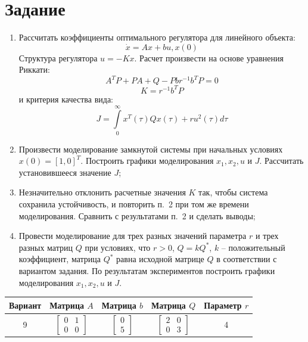 \documentclass[14pt, a4paper]{extarticle}
\begin{document}
	\onehalfspacing
	
	\setcounter{page}{2}
	
	\section*{Задание}
	
	\begin{enumerate}
		\item Рассчитать коэффициенты оптимального регулятора для линейного объекта:
		$$\dot{x}=Ax+bu, x(0)$$
		Структура регулятора $u=-Kx$. Расчет произвести на основе уравнения Риккати:
		$$A^TP+PA+Q-Pbr^{-1}b^TP=0$$
		$$K=r^{-1}b^TP$$
		и критерия качества вида:
		$$J=\int\limits_{0}^{\infty}x^T(\tau)Qx(\tau)+ru^2(\tau)d\tau$$
		\item Произвести моделирование замкнутой системы при начальных условиях $x(0)=[1,0]^T$. Построить графики моделирования $x_1,x_2,u$ и $J$. Рассчитать установившееся значение $J$;
		\item Незначительно отклонить расчетные значения $K$ так, чтобы система сохранила устойчивость, и повторить п.~2 при том же времени моделирования. Сравнить с результатами п.~2 и сделать выводы;
		\item Провести моделирование для трех разных значений параметра $r$ и трех разных матриц $Q$ при условиях, что $r>0$, $Q=kQ^*$, $k$ -- положительный коэффициент, матрица $Q^*$ равна исходной матрице $Q$ в соответствии с вариантом задания. По результатам экспериментов построить графики моделирования $x_1,x_2,u$ и $J$.
	\end{enumerate}
	\begin{table}[h]
		\centering
		\begin{tabular}{|c|c|c|c|c|}
			\hline
			Вариант & Матрица $A$ & Матрица $b$ & Матрица $Q$ & Параметр $r$ \\\hline
			9 & 
			$\left[
			\begin{matrix}
				0 & 1 \\
				0 & 0 
			\end{matrix}
			\right]$
			& 
			$\left[
			\begin{matrix}
				0 \\ 5
			\end{matrix}
			\right]$
			& 
			$\left[
			\begin{matrix}
				2 & 0 \\
				0 & 3 
			\end{matrix}
			\right]$
			& 4 \\\hline
		\end{tabular}
	\end{table}
	
\end{document}
